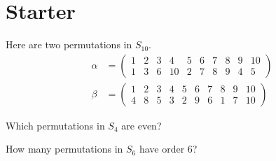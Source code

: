 \documentclass[answers]{exam}
\begin{document}
\section*{Starter}
\begin{questions}

\question%
Here are two permutations in $S_{10}$. \[
	\begin{aligned}
		\alpha&=\begin{pmatrix}
			1 & 2 & 3 &  4 & 5 & 6 & 7 & 8 & 9 & 10 \\
			1 & 3 & 6 & 10 & 2 & 7 & 8 & 9 & 4 &  5
		\end{pmatrix} \\
		\beta&=\begin{pmatrix}
			1 & 2 & 3 & 4 & 5 & 6 & 7 & 8 & 9 & 10 \\
			4 & 8 & 5 & 3 & 2 & 9 & 6 & 1 & 7 & 10
		\end{pmatrix}
	\end{aligned}
\]



\question%
Which permutations in $S_{4}$ are even?



\question%
How many permutations in $S_{6}$ have order 6?

\end{questions}
\end{document}
